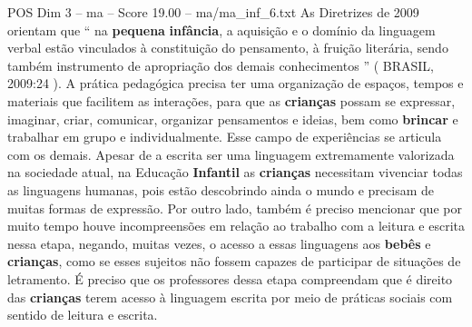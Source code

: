 \begin{textsample}{POS Dim 3 – ma – Score 19.00 – ma/ma\_inf\_6.txt}
As Diretrizes de 2009 orientam que “ na \textbf{pequena} \textbf{infância}, a aquisição e o domínio da linguagem verbal estão vinculados à constituição do pensamento, à fruição literária, sendo também instrumento de apropriação dos demais conhecimentos ” ( BRASIL, 2009:24 ).
A prática pedagógica precisa ter uma organização de espaços, tempos e materiais que facilitem as interações, para que as \textbf{crianças} possam se expressar, imaginar, criar, comunicar, organizar pensamentos e ideias, bem como \textbf{brincar} e trabalhar em grupo e individualmente.
Esse campo de experiências se articula com os demais.
Apesar de a escrita ser uma linguagem extremamente valorizada na sociedade atual, na Educação \textbf{Infantil} as \textbf{crianças} necessitam vivenciar todas as linguagens humanas, pois estão descobrindo ainda o mundo e precisam de muitas formas de expressão.
Por outro lado, também é preciso mencionar que por muito tempo houve incompreensões em relação ao trabalho com a leitura e escrita nessa etapa, negando, muitas vezes, o acesso a essas linguagens aos \textbf{bebês} e \textbf{crianças}, como se esses sujeitos não fossem capazes de participar de situações de letramento.
É preciso que os professores dessa etapa compreendam que é direito das \textbf{crianças} terem acesso à linguagem escrita por meio de práticas sociais com sentido de leitura e escrita.

\end{textsample}
